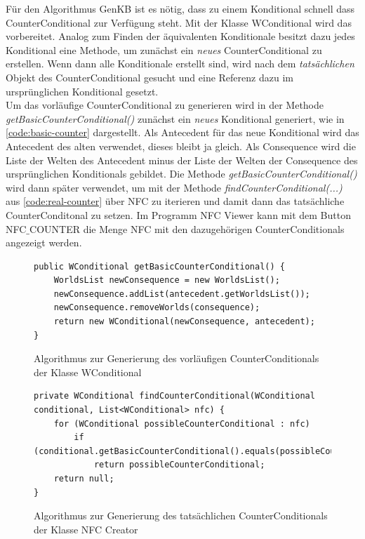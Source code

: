 \documentclass[12pt,a4paper]{article}
\begin{document}
Für den Algorithmus GenKB ist es nötig, dass zu einem Konditional schnell dass CounterConditional zur Verfügung steht. Mit der Klasse WConditional wird das vorbereitet. Analog zum Finden der äquivalenten Konditionale besitzt dazu jedes Konditional eine Methode, um zunächst ein \textit{neues} CounterConditional zu erstellen. Wenn dann alle Konditionale erstellt sind, wird nach dem \textit{tatsächlichen} Objekt des CounterConditional gesucht und eine Referenz dazu im ursprünglichen Konditional gesetzt. \\
Um das vorläufige CounterConditional zu generieren wird in der Methode \textit{getBasicCounterConditional()} zunächst ein \textit{neues} Konditional generiert, wie in \autoref{code:basic-counter} dargestellt. Als Antecedent für das neue Konditional wird das Antecedent des alten verwendet, dieses bleibt ja gleich. Als Consequence wird die Liste der Welten des Antecedent minus der Liste der Welten der Consequence des ursprünglichen Konditionals gebildet. Die Methode \textit{getBasicCounterConditional()} wird dann später verwendet, um mit der Methode \textit{findCounterConditional(...)} aus \autoref{code:real-counter} über NFC zu iterieren und damit dann das tatsächliche CounterConditonal zu setzen. Im Programm NFC Viewer kann mit dem Button NFC$\_$COUNTER die Menge NFC mit den dazugehörigen CounterConditionals angezeigt werden.



\begin{figure}
\begin{lstlisting}
public WConditional getBasicCounterConditional() {
    WorldsList newConsequence = new WorldsList();
    newConsequence.addList(antecedent.getWorldsList());
    newConsequence.removeWorlds(consequence);
    return new WConditional(newConsequence, antecedent);
}
\end{lstlisting}
\caption{Algorithmus zur Generierung des vorläufigen CounterConditionals der Klasse WConditional}
\label{code:basic-counter}
\end{figure} 


\begin{figure}
\begin{lstlisting}
private WConditional findCounterConditional(WConditional conditional, List<WConditional> nfc) {
    for (WConditional possibleCounterConditional : nfc)
        if (conditional.getBasicCounterConditional().equals(possibleCounterConditional))
            return possibleCounterConditional;
    return null;
}
\end{lstlisting}
\caption{Algorithmus zur Generierung des tatsächlichen CounterConditionals der Klasse NFC Creator}
\label{code:real-counter}
\end{figure} 
\end{document}
